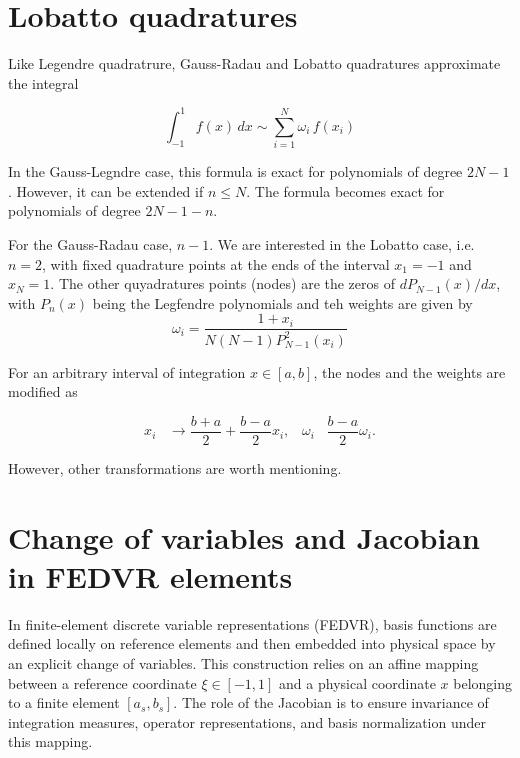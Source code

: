 \section{Lobatto quadratures}

Like Legendre quadratrure, Gauss-Radau and Lobatto quadratures
approximate the integral 

\begin{equation}
  \int_{-1}^{1} f(x)\,dx \sim \sum_{i=1}^N \omega_i\,f(x_i)
\end{equation}

In the Gauss-Legndre case, this formula is exact for 
polynomials of degree $2N-1$. However, it can be extended if 
$n\leqslant N$. The formula becomes exact for polynomials
of degree $2N-1-n$.

For the Gauss-Radau case, $n-1$.
We are interested in the Lobatto case, i.e. $n=2$, with fixed
quadrature points at the ends of the interval $x_1=-1$ and $x_N=1$.
The other quyadratures points (nodes) are the zeros of $dP_{N-1}(x)/dx$, 
with $P_n(x)$ being the Legfendre polynomials and teh weights are given by
\begin{equation}
\omega_i = \frac{1+x_i}{N(N-1)P_{N-1}^2(x_i)}
\end{equation}

For an arbitrary interval of integration $x \in \left[a,b\right]$,
the nodes and the weights are modified as

\begin{equation}
x_i \hspace{10pt} \longrightarrow \frac{b+a}{2} + \frac{b-a}{2}x_i,
\hspace{10pt}
\omega_i \hspace{10pt} \frac{b-a}{2}\omega_i.
\end{equation}

However, other transformations are worth mentioning.


\newpage

\section{Change of variables and Jacobian in FEDVR elements}

In finite-element discrete variable representations (FEDVR), basis functions are defined locally on reference elements and then embedded into physical space by an explicit change of variables. This construction relies on an affine mapping between a reference coordinate $\xi \in [-1,1]$ and a physical coordinate $x$ belonging to a finite element $[a_s,b_s]$. The role of the Jacobian is to ensure invariance of integration measures, operator representations, and basis normalization under this mapping.

